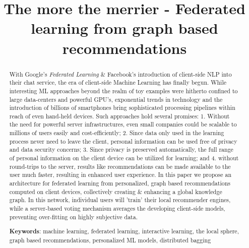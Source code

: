 \documentclass{llncs}
\begin{document}
\title{The more the merrier - Federated learning from graph based recommendations}


	
\maketitle

\begin{abstract}
	
With Google's \textit{Federated Learning} \& Facebook's introduction of client-side NLP into their chat service, the era of client-side Machine Learning has finally begun. While interesting ML approaches beyond the realm of toy examples were hitherto confined to large data-centers and powerful GPU's, exponential trends in technology and the introduction of billions of smartphones bring sophisticated processing pipelines within reach of even hand-held devices. Such approaches hold several promises: 1. Without the need for powerful server infrastructures, even small companies could be scalable to millions of users easily and cost-efficiently; 2. Since data only used in the learning process never need to leave the client, personal information can be used free of privacy and data security concerns; 3. Since privacy is preserved automatically, the full range of personal information on the client device can be utilized for learning; and 4. without round-trips to the server, results like recommendations can be made available to the user much faster, resulting in enhanced user experience. In this paper we propose an architecture for federated learning from personalized, graph based recommendations computed on client devices, collectively creating & enhancing a global knowledge graph. In this network, individual users will 'train' their local recommender engines, while a server-based voting mechanism averages the developing client-side models, preventing over-fitting on highly subjective data.


\medskip

\textbf{Keywords}: machine learning, federated learning, interactive learning, the local sphere, graph based recommendations, personalized ML models, distributed bagging


\end{abstract}
\end{document}
